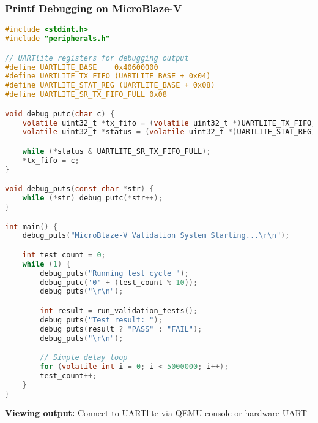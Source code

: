 \documentclass{beamer}
\begin{document}
\begin{frame}[fragile]
\frametitle{Printf Debugging on MicroBlaze-V}
\vspace{-0.3cm}
\begin{lstlisting}[language=C, basicstyle=\fontsize{6}{6}\selectfont\ttfamily, backgroundcolor={}]
#include <stdint.h>
#include "peripherals.h"

// UARTlite registers for debugging output
#define UARTLITE_BASE    0x40600000
#define UARTLITE_TX_FIFO (UARTLITE_BASE + 0x04)
#define UARTLITE_STAT_REG (UARTLITE_BASE + 0x08)
#define UARTLITE_SR_TX_FIFO_FULL 0x08

void debug_putc(char c) {
    volatile uint32_t *tx_fifo = (volatile uint32_t *)UARTLITE_TX_FIFO;
    volatile uint32_t *status = (volatile uint32_t *)UARTLITE_STAT_REG;

    while (*status & UARTLITE_SR_TX_FIFO_FULL);
    *tx_fifo = c;
}

void debug_puts(const char *str) {
    while (*str) debug_putc(*str++);
}

int main() {
    debug_puts("MicroBlaze-V Validation System Starting...\r\n");

    int test_count = 0;
    while (1) {
        debug_puts("Running test cycle ");
        debug_putc('0' + (test_count % 10));
        debug_puts("\r\n");

        int result = run_validation_tests();
        debug_puts("Test result: ");
        debug_puts(result ? "PASS" : "FAIL");
        debug_puts("\r\n");

        // Simple delay loop
        for (volatile int i = 0; i < 5000000; i++);
        test_count++;
    }
}
\end{lstlisting}

\begin{center}
\tiny \textbf{Viewing output:} Connect to UARTlite via QEMU console or hardware UART
\end{center}
\end{frame}
\end{document}

